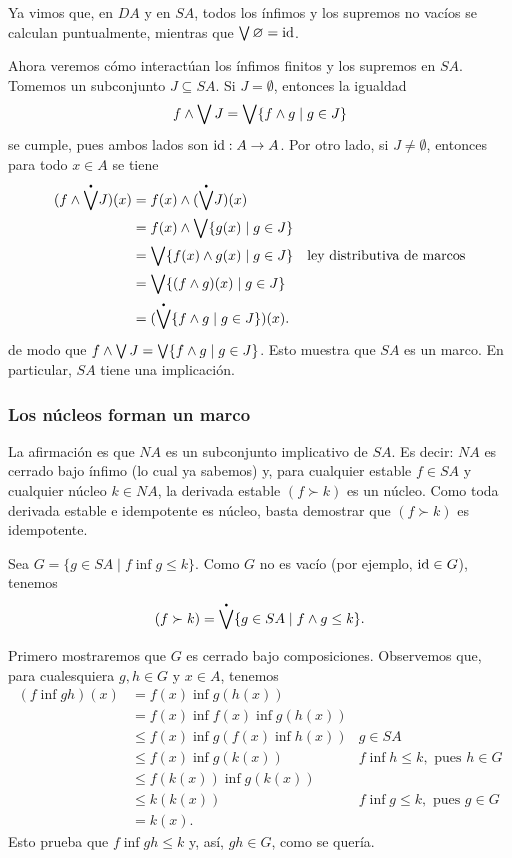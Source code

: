 Ya vimos que, en $DA$ y en $SA$, todos los ínfimos
y los supremos no vacíos se calculan puntualmente,
mientras que $\bigvee\varnothing=\mathrm{id}$.


Ahora veremos cómo interactúan los ínfimos finitos
y los supremos en $SA$.
Tomemos un subconjunto $J\subseteq SA$.
Si $J=\emptyset$, entonces la igualdad
\[
  f\wedge \bigvee J = \bigvee\{f\wedge g \mid g\in J\}
\]
se cumple, pues ambos lados son $\mathrm{id}:A\to A$.
Por otro lado, si $J\neq\emptyset$, entonces para todo $x\in A$
se tiene
\begin{align*}
  (f\inf \pSup J)(x)
  &= f(x)\inf (\pSup J)(x) \\
  &= f(x)\inf \Sup\{g(x) \mid g\in J\} \\
  &= \Sup\{f(x)\inf g(x) \mid g\in J\}
    & \text{ley distributiva de marcos} \\
  &= \Sup\{(f\inf g)(x) \mid g\in J\} \\
  &= (\pSup\{f\inf g \mid g\in J\})(x).
\end{align*}
de modo que $f\wedge\bigvee J = \bigvee\{f\wedge g\mid g\in J\}$.
Esto muestra que $SA$ es un marco.
En particular, $SA$ tiene una implicación.

\subsubsection{Los núcleos forman un marco}

La afirmación es que $NA$ es un subconjunto implicativo de $SA$.
Es decir: $NA$ es cerrado bajo ínfimo (lo cual ya sabemos) y,
para cualquier estable $f\in SA$ y cualquier núcleo $k\in NA$, la
derivada estable $(f\succ k)$ es un núcleo.
Como toda derivada estable e idempotente es núcleo,
basta demostrar que $(f\succ k)$ es idempotente.

Sea $G=\{g\in SA \mid f\inf g\leq k\}$.
Como $G$ no es vacío (por ejemplo, $\mathrm{id}\in G$), tenemos
\[
  (f\succ k) = \pSup\{g\in SA \mid f\inf g\leq k\}
.\]

Primero mostraremos que $G$ es cerrado bajo composiciones.
Observemos que, para cualesquiera $g,h\in G$ y $x\in A$, tenemos
\begin{align*}
  (f\inf gh)(x)
  &= f(x)\inf g(h(x)) \\
  &= f(x)\inf f(x) \inf g(h(x)) \\
  &\leq f(x) \inf g(f(x)\inf h(x))
    & g\in SA \\
  &\leq f(x) \inf g(k(x))
    & f\inf h \leq k, \text{ pues } h\in G \\
  &\leq f(k(x)) \inf g(k(x)) \\
  &\leq k(k(x))
    & f\inf g \leq k, \text{ pues } g\in G \\
  &= k(x).
\end{align*}
Esto prueba que $f\inf gh \leq k$ y, así, $gh\in G$, como se
quería.

